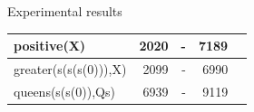 \documentclass[pdf,slideColor,contemporain]{prosper}
\begin{document}
\begin{slide}{Experimental results}
\begin{tiny}
\begin{table}[t]
\begin{tabular}{||l|r|r|r|r||}
positive(X)                  &  2020      &  -       &  7189   &          \\ 
\hline %
greater(s(s(s(0))),X)        &  2099      &  -       &  6990   &          \\ 
\hline %
queens(s(s(0)),Qs)           &  6939      &  -       &  9119   &          \\ 

\hline %
\hline %

\end{tabular}

\end{table}
 

\end{tiny}

\end{slide}
\end{document}
